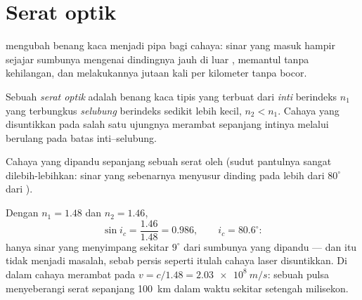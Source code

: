 \section{Serat optik}

 mengubah benang kaca menjadi pipa bagi cahaya:
sinar yang masuk hampir sejajar sumbunya mengenai dindingnya jauh di
luar , memantul tanpa kehilangan, dan melakukannya jutaan
kali per kilometer tanpa bocor.

\begin{definition}\label{def:g10:refraction:fiber}
Sebuah \emph{serat optik} adalah benang kaca tipis
yang terbuat dari \emph{inti} berindeks $n_1$ yang
terbungkus \emph{selubung} berindeks sedikit lebih
kecil, $n_2 < n_1$. Cahaya yang disuntikkan pada salah satu ujungnya
merambat sepanjang intinya melalui  berulang pada
batas inti--selubung.
\end{definition}

\begin{omfigure}

{\small Cahaya yang dipandu sepanjang  sebuah serat oleh  (sudut pantulnya sangat dilebih-lebihkan: sinar yang
sebenarnya menyusur dinding pada lebih dari $80^\circ$ dari ).}
\end{omfigure}

\begin{example}\label{ex:g10:refraction:fibernumbers}
Dengan $n_1 = 1.48$ dan $n_2 = 1.46$,
\[
\sin i_c = \frac{1.46}{1.48} = 0.986,
\qquad i_c = 80.6^\circ :
\]
hanya sinar yang menyimpang sekitar $9^\circ$ dari sumbunya yang
dipandu --- dan itu tidak menjadi masalah, sebab persis seperti itulah
cahaya laser disuntikkan. Di dalam  cahaya merambat pada
$v = c/1.48 = \qty{2.03e8}{m/s}$: sebuah pulsa menyeberangi serat
sepanjang \qty{100}{km} dalam waktu sekitar setengah milisekon.
\end{example}

